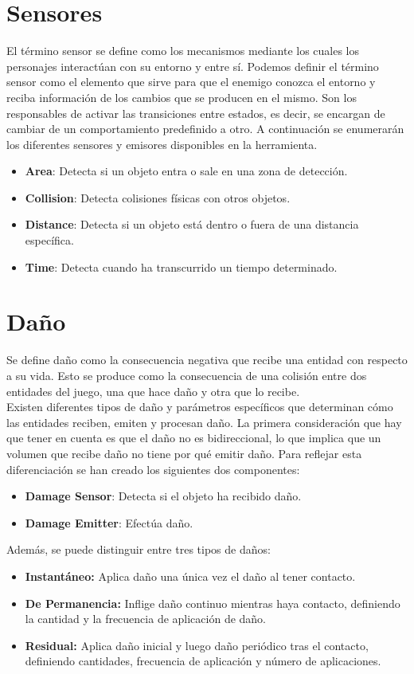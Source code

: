\section{Sensores}
\label{subsec:sensores}
El término sensor se define como los mecanismos mediante los cuales los personajes interactúan con su entorno y entre sí.
Podemos definir el término sensor como el elemento que sirve para que el enemigo conozca el entorno y reciba información de los cambios que se producen en el mismo. Son los responsables de activar las transiciones entre estados, es decir, se encargan de cambiar de un comportamiento predefinido a otro.
A continuación se enumerarán los diferentes sensores y emisores disponibles en la herramienta.
\begin{itemize}
    \item \textbf{Area}: Detecta si un objeto entra o sale en una zona de detección.
    \item \textbf{Collision}: Detecta colisiones físicas con otros objetos.
    \item \textbf{Distance}: Detecta si un objeto está dentro o fuera de una distancia específica.
    \item \textbf{Time}: Detecta cuando ha transcurrido un tiempo determinado.
\end{itemize}
\section{Daño}
Se define daño como la consecuencia negativa que recibe una entidad con respecto a su vida. Esto se produce como la consecuencia de una colisión entre dos entidades del juego, una que hace daño y otra que lo recibe.\\
Existen diferentes tipos de daño y parámetros específicos que determinan cómo las entidades reciben, emiten y procesan daño.
La primera consideración que hay que tener en cuenta es que el daño no es bidireccional, lo que implica que un volumen que recibe daño no tiene por qué emitir daño. Para reflejar esta diferenciación se han creado los siguientes dos componentes:
\begin{itemize}
    \item \textbf{Damage Sensor}: Detecta si el objeto ha recibido daño.
    \item \textbf{Damage Emitter}: Efectúa daño.
\end{itemize}

Además, se puede distinguir entre tres tipos de daños:
\begin{itemize}
    \item \textbf{Instantáneo:} Aplica daño una única vez el daño al tener contacto.
    \item \textbf{De Permanencia:} Inflige daño continuo mientras haya contacto, definiendo la cantidad y la frecuencia de aplicación de daño.
    \item \textbf{Residual:} Aplica daño inicial y luego daño periódico tras el contacto, definiendo cantidades, frecuencia de aplicación y número de aplicaciones.
\end{itemize}


